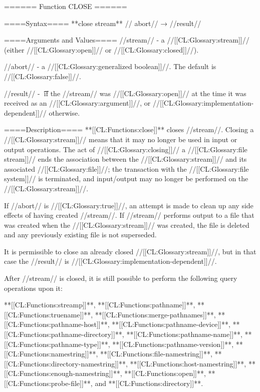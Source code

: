 ====== Function CLOSE ======

====Syntax====
**close {stream** //\key} abort// → //result//

====Arguments and Values====
//stream// - a //[[CL:Glossary:stream]]// (either //[[CL:Glossary:open]]// or //[[CL:Glossary:closed]]//).

//abort// - a //[[CL:Glossary:generalized boolean]]//. The default is //[[CL:Glossary:false]]//.

//result// - \t\ if the //stream// was //[[CL:Glossary:open]]// at the time it was received as an //[[CL:Glossary:argument]]//, or //[[CL:Glossary:implementation-dependent]]// otherwise.

====Description====
**[[CL:Functions:close]]** closes //stream//. Closing a //[[CL:Glossary:stream]]// means that it may no longer be used in input or output operations. The act of //[[CL:Glossary:closing]]// a //[[CL:Glossary:file stream]]// ends the association between the //[[CL:Glossary:stream]]// and its associated //[[CL:Glossary:file]]//; the transaction with the //[[CL:Glossary:file system]]// is terminated, and input/output may no longer be performed on the //[[CL:Glossary:stream]]//.

If //abort// is //[[CL:Glossary:true]]//, an attempt is made to clean up any side effects of having created //stream//. If //stream// performs output to a file that was created when the //[[CL:Glossary:stream]]// was created, the file is deleted and any previously existing file is not superseded.

It is permissible to close an already closed //[[CL:Glossary:stream]]//, but in that case the //result// is //[[CL:Glossary:implementation-dependent]]//.

After //stream// is closed, it is still possible to perform the following query operations upon it:

**[[CL:Functions:streamp]]**, **[[CL:Functions:pathname]]**, **[[CL:Functions:truename]]**, **[[CL:Functions:merge-pathnames]]**, **[[CL:Functions:pathname-host]]**, **[[CL:Functions:pathname-device]]**, **[[CL:Functions:pathname-directory]]**, **[[CL:Functions:pathname-name]]**, **[[CL:Functions:pathname-type]]**, **[[CL:Functions:pathname-version]]**, **[[CL:Functions:namestring]]**, **[[CL:Functions:file-namestring]]**, **[[CL:Functions:directory-namestring]]**, **[[CL:Functions:host-namestring]]**, **[[CL:Functions:enough-namestring]]**, **[[CL:Functions:open]]**, **[[CL:Functions:probe-file]]**, and **[[CL:Functions:directory]]**.

